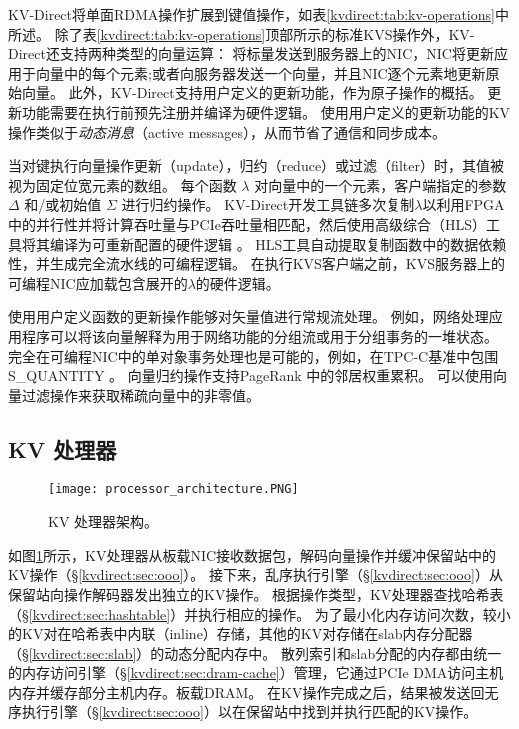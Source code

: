KV-Direct将单面RDMA操作扩展到键值操作，如表\ref {kvdirect:tab:kv-operations}中所述。
除了表\ref {kvdirect:tab:kv-operations}顶部所示的标准KVS操作外，KV-Direct还支持两种类型的向量运算：
将标量发送到服务器上的NIC，NIC将更新应用于向量中的每个元素;或者向服务器发送一个向量，并且NIC逐个元素地更新原始向量。
此外，KV-Direct支持用户定义的更新功能，作为原子操作的概括。
更新功能需要在执行前预先注册并编译为硬件逻辑。
使用用户定义的更新功能的KV操作类似于\textit {动态消息}（active messages）\cite {eicken1992active}，从而节省了通信和同步成本。

当对键执行向量操作更新（update），归约（reduce）或过滤（filter）时，其值被视为固定位宽元素的数组。
每个函数 $\lambda$ 对向量中的一个元素，客户端指定的参数 $\Delta$ 和/或初始值 $\Sigma$ 进行归约操作。
KV-Direct开发工具链多次复制$\lambda$以利用FPGA中的并行性并将计算吞吐量与PCIe吞吐量相匹配，然后使用高级综合（HLS）工具将其编译为可重新配置的硬件逻辑\cite {aoc} 。
HLS工具自动提取复制函数中的数据依赖性，并生成完全流水线的可编程逻辑。
在执行KVS客户端之前，KVS服务器上的可编程NIC应加载包含展开的$\lambda$的硬件逻辑。

使用用户定义函数的更新操作能够对矢量值进行常规流处理。
例如，网络处理应用程序可以将该向量解释为用于网络功能的分组流\cite{li2016clicknp}或用于分组事务的一堆状态\cite {sivaraman2016packet}。
完全在可编程NIC中的单对象事务处理也是可能的，例如，在TPC-C基准中包围S\_QUANTITY \cite {council2010tpc}。
向量归约操作支持PageRank \cite {page1999pagerank}中的邻居权重累积。
可以使用向量过滤操作来获取稀疏向量中的非零值。

\subsection{KV 处理器}
\label{kvdirect:sec:kv-processor}

\begin{figure}[t]
\centering
\texttt{[image: processor\_architecture.PNG]}
\caption{KV 处理器架构。}
\label{kvdirect:fig:kvprocessor-arch}

\end{figure}

如图\ref {kvdirect:fig:kvprocessor-arch}所示，KV处理器从板载NIC接收数据包，解码向量操作并缓冲保留站中的KV操作（\S \ref {kvdirect:sec:ooo}）。
接下来，乱序执行引擎（\S \ref {kvdirect:sec:ooo}）从保留站向操作解码器发出独立的KV操作。
根据操作类型，KV处理器查找哈希表（\S \ref {kvdirect:sec:hashtable}）并执行相应的操作。
为了最小化内存访问次数，较小的KV对在哈希表中内联（inline）存储，其他的KV对存储在slab内存分配器（\S \ref {kvdirect:sec:slab}）的动态分配内存中。
散列索引和slab分配的内存都由统一的内存访问引擎（\S \ref {kvdirect:sec:dram-cache}）管理，它通过PCIe DMA访问主机内存并缓存部分主机内存。板载DRAM。
在KV操作完成之后，结果被发送回无序执行引擎（\S \ref {kvdirect:sec:ooo}）以在保留站中找到并执行匹配的KV操作。

